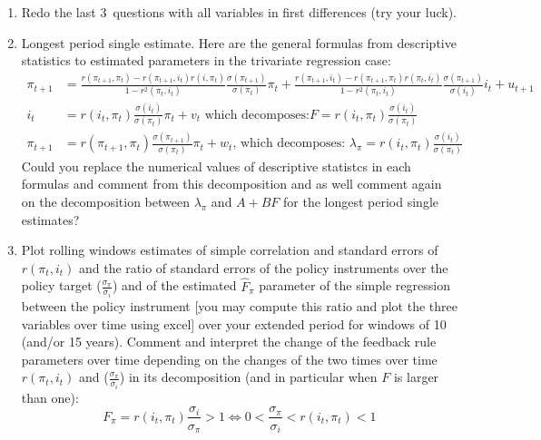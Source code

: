 \documentclass[12pt,a4paper]{article}%
\begin{document}
\begin{enumerate}
\item Redo the last 3\ questions with all variables in first differences (try
your luck).

\item Longest period single estimate. Here are the general formulas from
descriptive statistics to estimated parameters in the trivariate regression
case:%
\begin{align*}
\pi_{t+1} &  =\frac{r\left(  \pi_{t+1},\pi_{t}\right)  -r\left(  \pi
_{t+1},i_{t}\right)  r\left(  i,\pi_{t}\right)  }{1-r^{2}\left(  \pi_{t}%
,i_{t}\right)  }\frac{\sigma\left(  \pi_{t+1}\right)  }{\sigma\left(  \pi
_{t}\right)  }\pi_{t}+\frac{r\left(  \pi_{t+1},i_{t}\right)  -r\left(
\pi_{t+1},\pi_{t}\right)  r\left(  \pi_{t},i_{t}\right)  }{1-r^{2}\left(
\pi_{t},i_{t}\right)  }\frac{\sigma\left(  \pi_{t+1}\right)  }{\sigma\left(
i_{t}\right)  }i_{t}+u_{t+1}\\
i_{t} &  =r\left(  i_{t},\pi_{t}\right)  \frac{\sigma\left(  i_{t}\right)
}{\sigma\left(  \pi_{t}\right)  }\pi_{t}+v_{t}\text{ which decomposes:
}F=r\left(  i_{t},\pi_{t}\right)  \frac{\sigma\left(  i_{t}\right)  }%
{\sigma\left(  \pi_{t}\right)  }\\
\pi_{t+1} &  =r\left(  \pi_{t+1},\pi_{t}\right)  \frac{\sigma\left(  \pi
_{t+1}\right)  }{\sigma\left(  \pi_{t}\right)  }\pi_{t}+w_{t}\text{, which
decomposes: }\lambda_{\pi}=r\left(  i_{t},\pi_{t}\right)  \frac{\sigma\left(
i_{t}\right)  }{\sigma\left(  \pi_{t}\right)  }%
\end{align*}
Could you replace the numerical values of descriptive statistcs in each
formulas and comment from this decomposition and as well comment again on the
decomposition between $\lambda_{\pi}$ and $A+BF$ for the longest period single estimates?

\item Plot rolling windows estimates of simple correlation and standard errors
of $r(\pi_{t},i_{t})$ and the ratio of standard errors of the policy
instruments over the policy target ($\frac{\sigma_{\pi}}{\sigma_{i}}$) and of
the estimated $\widehat{F}_{\pi}$ parameter of the simple regression between
the policy instrument [you may compute this ratio and plot the three variables
over time using excel] over your extended period for windows of 10 (and/or 15
years). Comment and interpret the change of the feedback rule parameters over
time depending on the changes of the two times over time $r(\pi_{t},i_{t})$
and ($\frac{\sigma_{\pi}}{\sigma_{i}}$) in its decomposition (and in
particular when $F$ is larger than one):%
\[
F_{\pi}=r\left(  i_{t},\pi_{t}\right)  \frac{\sigma_{i}}{\sigma_{\pi}%
}>1\Leftrightarrow0<\frac{\sigma_{\pi}}{\sigma_{i}}<r\left(  i_{t},\pi
_{t}\right)  <1
\]



\end{enumerate}
\end{document}
